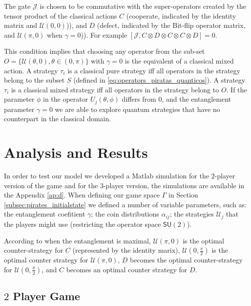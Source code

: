 \documentclass[10pt,twocolumn]{llncs}
\begin{document}
The gate $\mathcal{J}$ is chosen to be commutative with the super-operators created by the tensor product of the classical actions $C$ (cooperate, indicated by the identity matrix and $\mathcal{U}(0,0)$)), and $D$ (defect, indicated by the Bit-flip operator matrix, and $\mathcal{U}(\pi,0)$ when $\gamma = 0$)). For example $[ \mathcal{J} , C \otimes D \otimes C \otimes C \otimes D ] = 0 $.


This condition implies that choosing any operator from the sub-set $O = \{ \mathcal{U} ( \theta , 0) , \theta \in (0, \pi) \}$ with $\gamma = 0$ is the equivalent of a classical mixed action. A strategy $\tau_{i}$ is a classical pure strategy iff all operators in the strategy belong to the subset $S$ (defined in \ref{eq:operators_piratas_quanticos}). A strategy $\tau_{i}$ is a classical mixed strategy iff all operators in the strategy belong to $O$.
If the parameter $\phi$ in the operator $U_{j}(\theta ,\phi)$ differs from $0$, and the entanglement parameter $\gamma = 0$ we are able to explore quantum strategies that have no counterpart in the classical domain\cite{Eisert2008}.




\section{Analysis and Results}
\label{sec:description_3}


In order to test our model we developed a Matlab simulation for the $2$-player version of the game and for the $3$-player version, the simulations are available in the Appendix \ref{ap:d}. When defining our game space $\Gamma$ in Section \ref{subsec:pirates_initialstate} we defined a number of variable parameters, such as: the entanglement coefitient $\gamma$; the coin distributions $\alpha_{ij}$; the strategies $\mathcal{U}_{j}$ that the players might use (restricting the operator space $\mathsf{SU}(2)$).

According to \cite{Du} when the entanglement is maximal, $\mathcal{U}(\pi, 0)$ is the optimal counter-strategy for $C$ (represented by the identity marix), $\mathcal{U}(0, \frac{\pi}{2})$ is the optimal counter strategy for $\mathcal{U}(\pi, 0)$, $D$ becomes the optimal counter-strategy for $\mathcal{U}(0, \frac{\pi}{2})$, and $C$ becomes an optimal counter strategy for $D$. 

\subsection{$2$ Player Game}
\label{subsec:2playergame}
\end{document}
